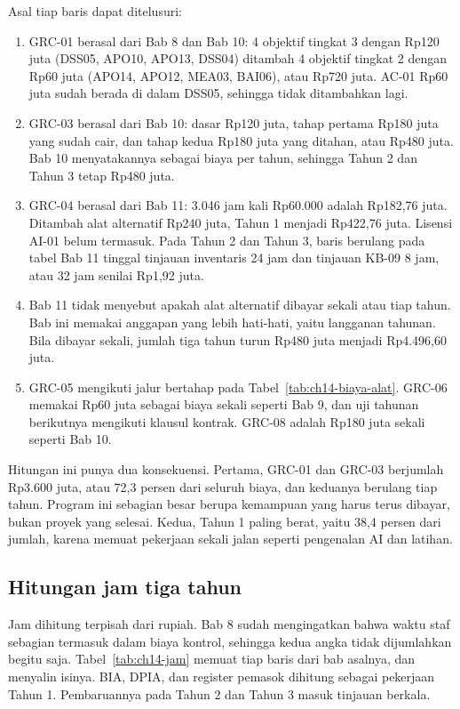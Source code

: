 Asal tiap baris dapat ditelusuri:
\begin{enumerate}
  \item GRC-01 berasal dari Bab 8 dan Bab 10: 4 objektif tingkat 3 dengan Rp120 juta (DSS05,
  APO10, APO13, DSS04) ditambah 4 objektif tingkat 2 dengan Rp60 juta (APO14, APO12, MEA03,
  BAI06), atau Rp720 juta. AC-01 Rp60 juta sudah berada di dalam DSS05, sehingga tidak ditambahkan
  lagi.
  \item GRC-03 berasal dari Bab 10: dasar Rp120 juta, tahap pertama Rp180 juta yang sudah cair, dan
  tahap kedua Rp180 juta yang ditahan, atau Rp480 juta. Bab 10 menyatakannya sebagai biaya per
  tahun, sehingga Tahun 2 dan Tahun 3 tetap Rp480 juta.
  \item GRC-04 berasal dari Bab 11: 3.046 jam kali Rp60.000 adalah Rp182,76 juta. Ditambah alat
  alternatif Rp240 juta, Tahun 1 menjadi Rp422,76 juta. Lisensi AI-01 belum termasuk. Pada Tahun 2
  dan Tahun 3, baris berulang pada tabel Bab 11 tinggal tinjauan inventaris 24 jam dan tinjauan
  KB-09 8 jam, atau 32 jam senilai Rp1,92 juta.
  \item Bab 11 tidak menyebut apakah alat alternatif dibayar sekali atau tiap tahun. Bab ini
  memakai anggapan yang lebih hati-hati, yaitu langganan tahunan. Bila dibayar sekali, jumlah tiga
  tahun turun Rp480 juta menjadi Rp4.496,60 juta.
  \item GRC-05 mengikuti jalur bertahap pada Tabel~\ref{tab:ch14-biaya-alat}. GRC-06 memakai Rp60
  juta sebagai biaya sekali seperti Bab 9, dan uji tahunan berikutnya mengikuti klausul kontrak.
  GRC-08 adalah Rp180 juta sekali seperti Bab 10.
\end{enumerate}

Hitungan ini punya dua konsekuensi. Pertama, GRC-01 dan GRC-03 berjumlah Rp3.600 juta, atau 72,3
persen dari seluruh biaya, dan keduanya berulang tiap tahun. Program ini sebagian besar berupa
kemampuan yang harus terus dibayar, bukan proyek yang selesai. Kedua, Tahun 1 paling berat, yaitu
38,4 persen dari jumlah, karena memuat pekerjaan sekali jalan seperti pengenalan AI dan latihan.

\subsection*{Hitungan jam tiga tahun}

Jam dihitung terpisah dari rupiah. Bab 8 sudah mengingatkan bahwa waktu staf sebagian termasuk
dalam biaya kontrol, sehingga kedua angka tidak dijumlahkan begitu saja. Tabel~\ref{tab:ch14-jam}
memuat tiap baris dari bab asalnya, dan 
menyalin isinya. BIA, DPIA, dan register pemasok dihitung sebagai pekerjaan Tahun 1. Pembaruannya
pada Tahun 2 dan Tahun 3 masuk tinjauan berkala.

